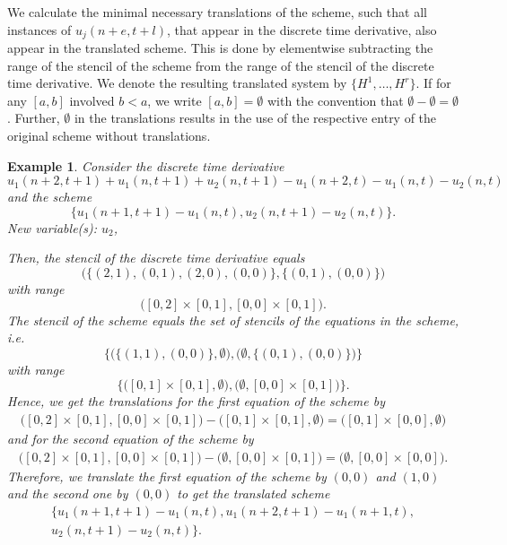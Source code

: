 \documentclass[sigconf,twocolumn]{acmart}
\newcommand{\1}{{\chi}}
\numberwithin{equation}{section}
\theoremstyle{thmlemcorr}
\numberwithin{theorem}{section}
\theoremstyle{thmlemcorr*}
\theoremstyle{defi}
\theoremstyle{remexample}
\newtheorem{example}[theorem]{Example}
\theoremstyle{ass}
\begin{document}
We calculate the minimal necessary translations of the scheme, such that all instances of \(u_j(n+e,t+l)\), that appear in the discrete time derivative, also appear in the translated scheme. This is done by elementwise subtracting the range of the stencil of the scheme from the range of the stencil of the discrete time derivative. We denote the resulting translated system by \(\{H^1,\ldots,H^r\}\).
If for any \([a,b]\) involved \(b<a\), we write \([a,b]=\emptyset\) with the convention that \(\emptyset-\emptyset=\emptyset\).  Further, \(\emptyset\) in the translations results in the use of the respective entry of the original scheme without translations.
	\begin{example}
		Consider the discrete time derivative
		\begin{equation*}
			u_1(n+2,t+1)+u_1(n,t+1)+u_2(n,t+1)-u_1(n+2,t)-u_1(n,t)-u_2(n,t)
		\end{equation*}
		and the scheme
		\begin{equation*}
			\{u_1(n+1,t+1)-u_1(n,t),u_2(n,t+1)-u_2(n,t)\}.
		\end{equation*}
{\color{blue} New variable(s): \(u_2\),  }

		Then, the stencil of the discrete time derivative equals 
		\begin{equation*}
			\Big( \big\{ (2,1),(0,1),(2,0),(0,0) \big\},\big\{(0,1),(0,0)\big\} \Big)
		\end{equation*}
		with range
		\begin{equation*}
			\Big([0,2]\times[0,1],[0,0]\times [0,1]\Big).
		\end{equation*}
		The stencil of the scheme equals the set of stencils of the equations in the scheme, i.e.
		\begin{equation*}
			\Bigg\{\Big(\big\{(1,1),(0,0)\big\},\emptyset\Big),\Big(\emptyset,\big\{(0,1),(0,0)\big\}\Big)\Bigg\}
		\end{equation*}
		with range
		\begin{equation*}
			\Bigg\{\Big([0,1]\times[0,1],\emptyset\Big),\Big(\emptyset,[0,0]\times [0,1]\Big)\Bigg\}.
		\end{equation*}
		Hence, we get the translations for the first equation of the scheme by
		\footnotesize
		\begin{gather*}
			\Big([0,2]\times[0,1],[0,0]\times [0,1]\Big)-\Big([0,1]\times[0,1],\emptyset\Big)=\Big([0,1]\times[0,0],\emptyset\Big)
		\end{gather*}
		\normalsize
		and for the second equation of the scheme by
		\footnotesize
		\begin{gather*}
			\Big([0,2]\times[0,1],[0,0]\times [0,1]\Big)-\Big(\emptyset,[0,0]\times [0,1]\Big)=\Big(\emptyset,[0,0]\times [0,0]\Big).
		\end{gather*}
		\normalsize
		Therefore, we translate the first equation of the scheme by \((0,0)\) and \((1,0)\) and the second one by \((0,0)\) to get the translated scheme
		\begin{gather*}
			\{u_1(n+1,t+1)-u_1(n,t),
			u_1(n+2,t+1)-u_1(n+1,t),\\
			u_2(n,t+1)-u_2(n,t)
			\}.
		\end{gather*}
	\end{example}
\end{document}
